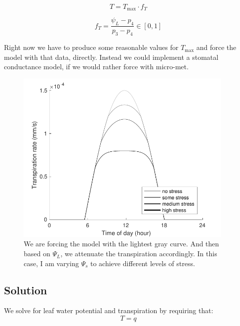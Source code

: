 \documentclass[11pt]{article}
\begin{document}
\begin{equation}
T = T_\text{max}\cdot f_T
\end{equation}

\begin{equation}
f_T = \dfrac{\psi_L - p_4}{p_3 - p_4} \in \left[0,1\right]
\end{equation}

Right now we have to produce some reasonable values for $T_\text{max}$ and force the model with that data, directly. Instead we could implement a stomatal conductance model, if we would rather force with micro-met.

\begin{figure}[h]
\centering
\includegraphics[width=25pc]{../figs/exp0}
\caption{We are forcing the model with the lightest gray curve. And then based on $\Psi_L$, we attenuate the transpiration accordingly. In this case, I am varying $\Psi_s$ to achieve different levels of stress.}
\label{fig:soln}
\end{figure}

\clearpage
\subsection{Solution}

We solve for leaf water potential and transpiration by requiring that: 
\begin{equation}
T = q
\end{equation}
\end{document}
